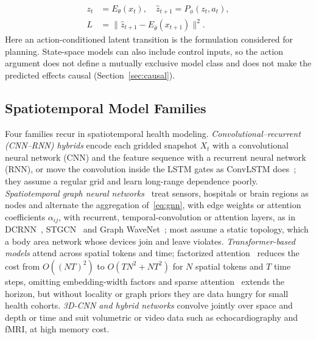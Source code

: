 \documentclass[journal]{IEEEtran}
\begin{document}
\begin{equation}
\begin{aligned}
z_t &= E_\theta(x_t), \quad \hat{z}_{t+1} = P_\phi(z_t, a_t),\\
L &= \bigl\| \hat{z}_{t+1} - E_{\bar{\theta}}(x_{t+1}) \bigr\|^2 .
\end{aligned}
\label{eq:wm}
\end{equation}
Here an action-conditioned latent transition is the formulation considered for planning. State-space models can also include control inputs, so the action argument does not define a mutually exclusive model class and does not make the predicted effects causal (Section~\ref{sec:causal}).

\subsection{Spatiotemporal Model Families}
\label{sec:families}
Four families recur in spatiotemporal health modeling. \emph{Convolutional--recurrent (CNN--RNN) hybrids} encode each gridded snapshot $X_t$ with a convolutional neural network (CNN) and the feature sequence with a recurrent neural network (RNN), or move the convolution inside the LSTM gates as ConvLSTM does~\cite{shi2015convolutional}; they assume a regular grid and learn long-range dependence poorly. \emph{Spatiotemporal graph neural networks}~\cite{shao2022longterm} treat sensors, hospitals or brain regions as nodes and alternate the aggregation of~\eqref{eq:gnn}, with edge weights or attention coefficients $\alpha_{ij}$, with recurrent, temporal-convolution or attention layers, as in DCRNN~\cite{li2018dcrnn}, STGCN~\cite{yu2018spatio} and Graph WaveNet~\cite{wu2019graphwavenet}; most assume a static topology, which a body area network whose devices join and leave violates. \emph{Transformer-based models} attend across spatial tokens and time; factorized attention~\cite{xu2020stransformer} reduces the cost from $O((NT)^2)$ to $O(TN^2+NT^2)$ for $N$ spatial tokens and $T$ time steps, omitting embedding-width factors and sparse attention~\cite{zhou2021informer} extends the horizon, but without locality or graph priors they are data hungry for small health cohorts. \emph{3D-CNN and hybrid networks} convolve jointly over space and depth or time and suit volumetric or video data such as echocardiography and fMRI, at high memory cost.
\end{document}
